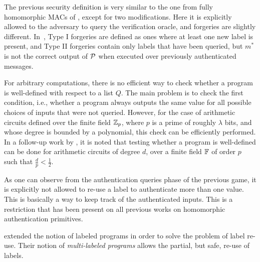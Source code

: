 The previous security definition is very similar to the one from fully
homomorphic MACs of \textcite{gennaro:wichs:2012}, except for two
modifications.  Here it is explicitly allowed to the adversary to query the
verification oracle, and forgeries are slightly different.
In~\cite{gennaro:wichs:2012}, Type I forgeries are defined as ones where at
least one new label is present, and Type II forgeries contain only labels that
have been queried, but $m^*$ is not the correct output of $\mathcal{P}$ when executed
over previously authenticated messages.

For arbitrary computations, there is no efficient way to check whether
a program is well-defined with respect to a list $Q$. The main problem is to
check the first condition, i.e., whether a program always outputs the same
value for all possible choices of inputs that were not queried. However, for
the case of arithmetic circuits defined over the finite field $\mathbb{Z}_p$, where
$p$ is a prime of roughly $\lambda$ bits, and whose degree is bounded by
a polynomial, this check can be efficiently performed. In a follow-up work by
\textcite{generalhmac}, it is noted that testing whether a program is
well-defined can be done for arithmetic circuits of degree $d$, over a finite
field $\mathbb{F}$ of order $p$ such that $\frac{d}{p} < \frac{1}{2}$.

As one can observe from the authentication queries phase of the previous game,
it is explicitly not allowed to re-use a label to authenticate more than one
value. This is basically a way to keep track of the authenticated inputs. This
is a restriction that has been present on all previous works on homomorphic
authentication primitives.

\textcite{backes:fiore:reischuk:2013} extended the notion of labeled programs
in order to solve the problem of label re-use. Their notion of
\emph{multi-labeled programs} allows the partial, but safe, re-use of labels.

